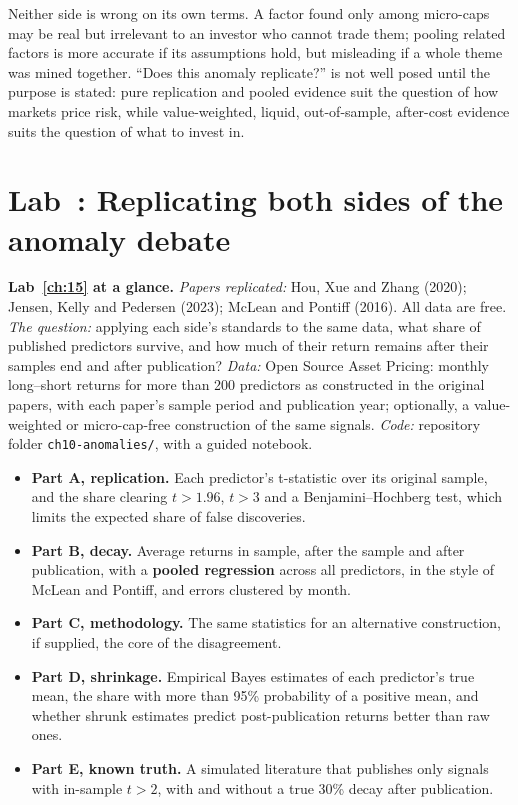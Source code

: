 Neither side is wrong on its own terms. A factor found only among micro-caps may be real but irrelevant to an investor who cannot trade them; pooling related factors is more accurate if its assumptions hold, but misleading if a whole theme was mined together. ``Does this anomaly replicate?'' is not well posed until the purpose is stated: pure replication and pooled evidence suit the question of how markets price risk, while value-weighted, liquid, out-of-sample, after-cost evidence suits the question of what to invest in.

\section{Lab~\thechapter: Replicating both sides of the anomaly debate}
\label{sec:19-lab}

\begin{callout}
\textbf{Lab~\ref{ch:15} at a glance.} \emph{Papers replicated:} Hou, Xue and Zhang (2020); Jensen, Kelly and Pedersen (2023); McLean and Pontiff (2016). All data are free. \emph{The question:} applying each side's standards to the same data, what share of published predictors survive, and how much of their return remains after their samples end and after publication? \emph{Data:} Open Source Asset Pricing: monthly long--short returns for more than 200 predictors as constructed in the original papers, with each paper's sample period and publication year; optionally, a value-weighted or micro-cap-free construction of the same signals. \emph{Code:} repository folder \texttt{ch10-anomalies/}, with a guided notebook.
\end{callout}

\begin{itemize}
  \item \textbf{Part A, replication.} Each predictor's t-statistic over its original sample, and the share clearing $t > 1.96$, $t > 3$ and a Benjamini--Hochberg test, which limits the expected share of false discoveries.
  \item \textbf{Part B, decay.} Average returns in sample, after the sample and after publication, with a \textbf{pooled regression} across all predictors, in the style of McLean and Pontiff, and errors clustered by month.
  \item \textbf{Part C, methodology.} The same statistics for an alternative construction, if supplied, the core of the disagreement.
  \item \textbf{Part D, shrinkage.} Empirical Bayes estimates of each predictor's true mean, the share with more than 95\% probability of a positive mean, and whether shrunk estimates predict post-publication returns better than raw ones.
  \item \textbf{Part E, known truth.} A simulated literature that publishes only signals with in-sample $t > 2$, with and without a true 30\% decay after publication.
\end{itemize}

